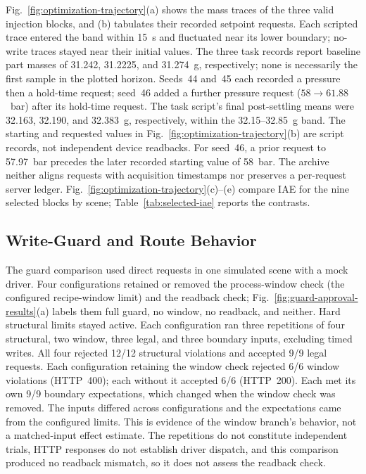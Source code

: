 Fig.~\ref{fig:optimization-trajectory}(a) shows the mass traces of the three valid injection blocks, and (b) tabulates their recorded setpoint requests. Each scripted trace entered the band within 15~s and fluctuated near its lower boundary; no-write traces stayed near their initial values. The three task records report baseline part masses of 31.242, 31.2225, and 31.274~g, respectively; none is necessarily the first sample in the plotted horizon. Seeds~44 and~45 each recorded a pressure then a hold-time request; seed~46 added a further pressure request ($58\rightarrow61.88$~bar) after its hold-time request. The task script's final post-settling means were 32.163, 32.190, and 32.383~g, respectively, within the 32.15--32.85~g band. The starting and requested values in Fig.~\ref{fig:optimization-trajectory}(b) are script records, not independent device readbacks. For seed~46, a prior request to 57.97~bar precedes the later recorded starting value of 58~bar. The archive neither aligns requests with acquisition timestamps nor preserves a per-request server ledger. Fig.~\ref{fig:optimization-trajectory}(c)--(e) compare IAE for the nine selected blocks by scene; Table~\ref{tab:selected-iae} reports the contrasts.

\subsection{Write-Guard and Route Behavior}
\label{sec:eval-ablation}
The guard comparison used direct requests in one simulated scene with a mock driver. Four configurations retained or removed the process-window check (the configured recipe-window limit) and the readback check; Fig.~\ref{fig:guard-approval-results}(a) labels them full guard, no window, no readback, and neither. Hard structural limits stayed active. Each configuration ran three repetitions of four structural, two window, three legal, and three boundary inputs, excluding timed writes. All four rejected 12/12 structural violations and accepted 9/9 legal requests. Each configuration retaining the window check rejected 6/6 window violations (HTTP~400); each without it accepted 6/6 (HTTP~200). Each met its own 9/9 boundary expectations, which changed when the window check was removed. The inputs differed across configurations and the expectations came from the configured limits. This is evidence of the window branch's behavior, not a matched-input effect estimate. The repetitions do not constitute independent trials, HTTP responses do not establish driver dispatch, and this comparison produced no readback mismatch, so it does not assess the readback check.

